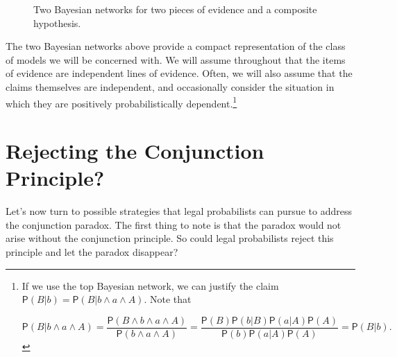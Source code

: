 \documentclass[10pt,dvipsnames,enabledeprecatedfontcommands]{scrartcl}
\newcommand{\pr}[1]{\mathsf{P}(#1)}
\begin{document}
\begin{center}
\begin{figure}[h!]

\caption{Two Bayesian networks for two pieces of evidence and a composite hypothesis.}
\label{network-conjunction}
\end{figure}
\end{center}

The two Bayesian networks above provide a compact representation of the
class of models we will be concerned with. We will assume throughout
that the items of evidence are independent lines of evidence. Often, we
will also assume that the claims themselves are independent, and
occasionally consider the situation in which they are positively
probabilistically
dependent.\footnote{If we use the top Bayesian network, we can justify the claim
$\pr{B \vert b}=\pr{B \vert b \wedge a \wedge A}$. Note that 

\[\pr{B \vert b \wedge a \wedge A}= \frac{\pr{B \wedge b \wedge a \wedge A}}{\pr{b \wedge a \wedge A}}
=\frac{\pr{B}\pr{b\vert B}\pr{a \vert A} \pr{A}}{\pr{b} \pr{a \vert A}\pr{A}}=\pr{B \vert b}.\]

}

\section{Rejecting the Conjunction
Principle?}\label{rejecting-the-conjunction-principle}

Let's now turn to possible strategies that legal probabilists can pursue
to address the conjunction paradox. The first thing to note is that the
paradox would not arise without the conjunction principle. So could
legal probabilists reject this principle and let the paradox disappear?
\end{document}
